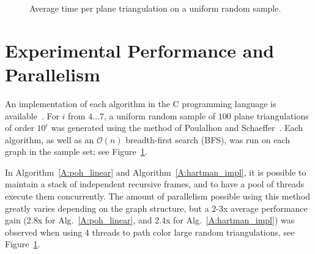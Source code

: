 \documentclass[12pt,letterpaper]{article}
\theoremstyle{plain}
\theoremstyle{definition}
\theoremstyle{break}
\begin{document}
\begin{figure}[ht]
\begin{center}
\caption{Average time per plane triangulation on a uniform random sample.}
    \label{F:plot}
\end{center}
\end{figure}

\section{Experimental Performance and Parallelism}\label{S:performance}

An implementation of each algorithm in the C programming language is available~\cite{Bro2017}.
For $i$ from $4\ldots 7$, a uniform random sample of $100$
plane triangulations of order $10^i$ was
generated using the method of
Poulalhon and Schaeffer~\cite{Pou2006}. 
Each algorithm, as well as an $\mathcal{O}(n)$ breadth-first
search (BFS), was run on each graph in the sample set;
see Figure~\ref{F:plot}.

In Algorithm~\ref{A:poh_linear} and Algorithm~\ref{A:hartman_impl}, it
is possible to maintain a
stack of independent recursive frames, and to have a pool of threads execute them
concurrently. The amount of parallelism possible using this method
greatly varies depending on the graph structure, but a
2-3x average performance
gain (2.8x for Alg.~\ref{A:poh_linear}, and 2.4x for Alg.~\ref{A:hartman_impl})
was observed when using 4 threads to path color large random triangulations,
see Figure~\ref{F:plot}.
\end{document}
